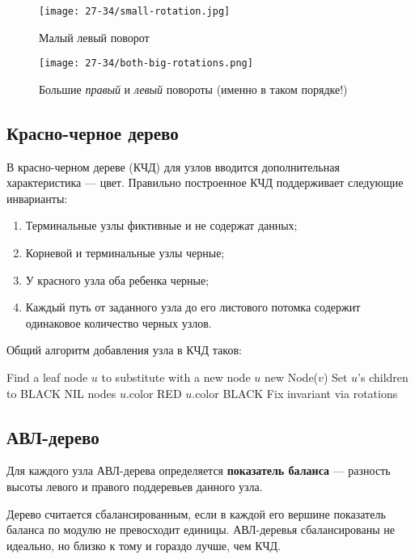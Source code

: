 \begin{figure}
  \begin{center}
  \texttt{[image: 27-34/small-rotation.jpg]}
  \caption{Малый левый поворот}
  \label{fig:small-rotation}
  \end{center}
\end{figure}
\begin{figure}
  \begin{center}
  \texttt{[image: 27-34/both-big-rotations.png]}
  \caption{Большие \textit{правый} и \textit{левый} повороты (именно в таком порядке!)}
  \label{fig:big-rotation}
  \end{center}
\end{figure}

\subsection{Красно-черное дерево}
В красно-черном дереве (КЧД) для узлов вводится дополнительная характеристика --- цвет.
Правильно построенное КЧД поддерживает следующие инварианты:
\begin{enumerate}
  \item Терминальные узлы фиктивные и не содержат данных;
  \item Корневой и терминальные узлы черные;
  \item У красного узла оба ребенка черные;
  \item Каждый путь от заданного узла до его листового потомка содержит одинаковое количество черных узлов.
\end{enumerate}

Общий алгоритм добавления узла в КЧД таков:
\begin{algorithmic}
    \State Find a leaf node $u$ to substitute with a new node
    \State $u$ \asgn new Node($v$)
    \State Set $u$'s children to BLACK NIL nodes
    \State $u$.color \asgn RED
      \State $u$.color \asgn BLACK
      \State Fix invariant via rotations
    \EndIf
  \EndProcedure
\end{algorithmic}
\subsection{АВЛ-дерево}
Для каждого узла АВЛ-дерева определяется \textbf{показатель баланса} --- разность
высоты левого и правого поддеревьев данного узла.

Дерево считается сбалансированным, если в каждой его вершине показатель баланса
по модулю не превосходит единицы. АВЛ-деревья сбалансированы не идеально, но близко
к тому и гораздо лучше, чем КЧД.

